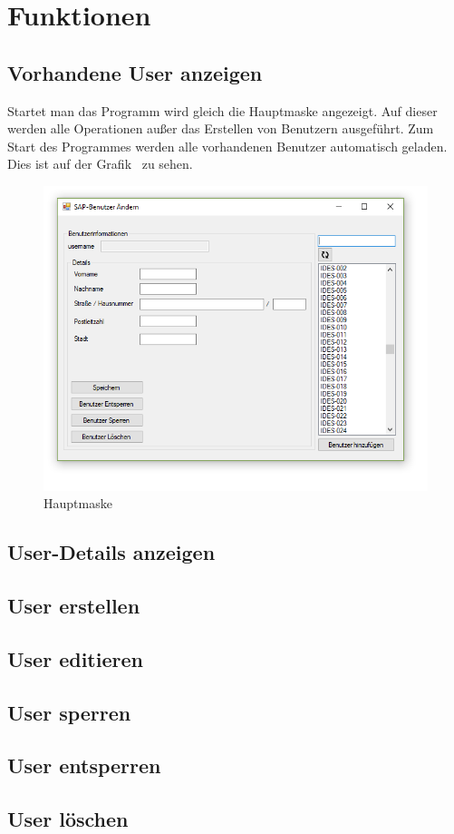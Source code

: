 \section{Funktionen}

\subsection{Vorhandene User anzeigen}

Startet man das Programm wird gleich die Hauptmaske angezeigt. Auf dieser werden alle Operationen außer das Erstellen von Benutzern ausgeführt. Zum Start des Programmes werden alle vorhandenen Benutzer automatisch geladen. Dies ist auf der Grafik \ zu sehen. 

\begin{figure}[h]
	\includegraphics[width=\textwidth]{images/Main.png}
	\caption{Hauptmaske}
\end{figure}

\subsection{User-Details anzeigen}

\subsection{User erstellen}

\subsection{User editieren}

\subsection{User sperren}

\subsection{User entsperren}

\subsection{User löschen}